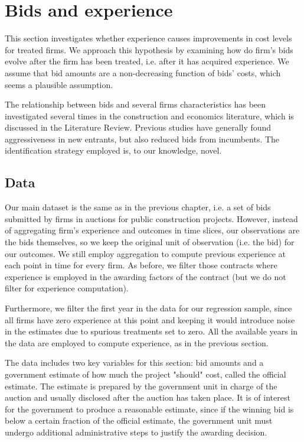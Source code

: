 \section{Bids and experience}
\label{section:bidsexp}
This section investigates whether experience causes improvements in cost levels for treated firms. We approach this hypothesis by examining how do firm's bids evolve after the firm has been treated, i.e. after it has acquired experience. We assume that bid amounts are a non-decreasing function of bids' costs, which seems a plausible assumption.

The relationship between bids and several firms characteristics has been investigated several times in the construction and economics literature, which is discussed in the Literature Review. Previous studies have generally found aggressiveness in new entrants, but also reduced bids from incumbents. The identification strategy employed is, to our knowledge, novel.


\subsection{Data}
Our main dataset is the same as in the previous chapter, i.e. a set of bids submitted by firms in auctions for public construction projects. However, instead of aggregating firm's experience and outcomes in time slices, our observations are the bids themselves, so we keep the original unit of observation (i.e. the bid) for our outcomes. We still employ aggregation to compute previous experience at each point in time for every firm. As before, we filter those contracts where experience is employed in the awarding factors of the contract (but we do not filter for experience computation).

Furthermore, we filter the first year in the data for our regression sample, since all firms have zero experience at this point and keeping it would introduce noise in the estimates due to spurious treatments set to zero. All the available years in the data are employed to compute experience, as in the previous section.

The data includes two key variables for this section: bid amounts and a government estimate of how much the project "should" cost, called the official estimate. The estimate is prepared by the government unit in charge of the auction and usually disclosed after the auction has taken place. It is of interest for the government to produce a reasonable estimate, since if the winning bid is below a certain fraction of the official estimate, the government unit must undergo additional administrative steps to justify the awarding decision.

